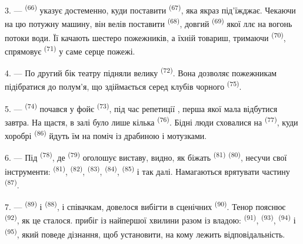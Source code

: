 3. ---  \textsuperscript{(66)} указує достеменно, куди поставити
 \textsuperscript{(67)}, яка якраз під'їжджає. Чекаючи на цю
потужну машину, він велів поставити  \textsuperscript{(68)},
довгий  \textsuperscript{(69)} якої ллє на вогонь потоки води. Її
качають шестеро пожежників, а їхній товариш, тримаючи 
\textsuperscript{(70)}, спрямовує  \textsuperscript{(71)} у саме
серце пожежі.

4. --- По другий бік театру підняли велику 
\textsuperscript{(72)}. Вона дозволяє пожежникам підібратися до полум'я, що
здіймається серед клубів чорного  \textsuperscript{(75)}.

\VUsaut{5.0mm}
\VUsaut{3.4mm}

5. ---  \textsuperscript{(74)} почався у фойє 
\textsuperscript{(73)}, під час репетиції , перша 
якої мала відбутися завтра. На щастя, в залі було лише кілька 
\textsuperscript{(76)}. Бідні люди сховалися на 
\textsuperscript{(77)}, куди хоробрі  \textsuperscript{(86)}
йдуть їм на поміч із драбиною і мотузками.

6. --- Під  \textsuperscript{(78)}, де 
\textsuperscript{(79)} оголошує виставу, видно, як біжать 
\textsuperscript{(81)}  \textsuperscript{(80)}, несучи свої
інструменти:  \textsuperscript{(81)}, 
\textsuperscript{(82)},  \textsuperscript{(83)},
 \textsuperscript{(84)}, 
\textsuperscript{(85)} і так далі. Намагаються врятувати частину 
\textsuperscript{(87)}.

7. ---  \textsuperscript{(89)} і 
\textsuperscript{(88)},  і співачкам, довелося вибігти в
сценічних  \textsuperscript{(90)}. Тенор пояснює
 \textsuperscript{(92)}, як це сталося. 
прибіг із найпершої хвилини разом із владою: 
\textsuperscript{(91)},  \textsuperscript{(93)},
 \textsuperscript{(94)} і 
\textsuperscript{(95)}, який поведе дізнання, щоб установити, на кому лежить
відповідальність.
\VUsaut{6.0mm}
\VUfilet{22mm}
